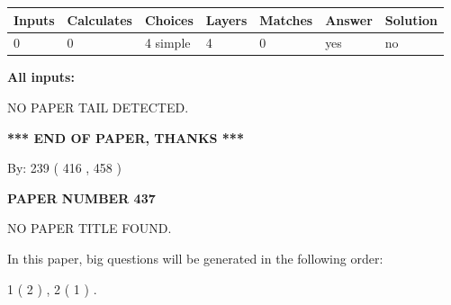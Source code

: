 \documentclass[12pt]{article}
\begin{document}
 
   
   
   
   
\noindent\begin{tabular}{|l|l|l|l|l|l|l|}
 \hline
Inputs & Calculates & Choices & Layers & Matches & Answer & Solution \\ \hline
 0  & 
 0  & 
 4
  simple  
  & 
 4  & 
 0  & 
  yes & 
  no 
  \\ \hline
 \end{tabular}
   
   
   
   
\noindent{}
   
   
   
   
\noindent\vspace{0.1in}\hspace{-0.08in} {\textbf{\Large{All inputs: }}}
   
   
   
   
\vspace{2.0in} NO PAPER TAIL DETECTED.
   
   
   
   
\vspace{1.0in} 
{\textbf{\large{ *** END OF PAPER, THANKS *** }}} 
   
   
\hspace{1.0in} By: 
 239 ( 416 ,  458 )
   
   
   
   
\newpage 
\setcounter{page}{ 
   437001 } 
   
   
   
   
 {\textbf{ \Large{ PAPER NUMBER  437  }}}
   
   
\vspace{0.2in}
   
   
   
   
   
   
 NO PAPER TITLE FOUND.
   
   
   
\vspace{0.2in}
   
In this paper, big questions will be generated in the following order: 
   
   
   1 ( 2 )
 ,
   2 ( 1 )
 .
  
\vspace{0.2in}
  
\end{document}

